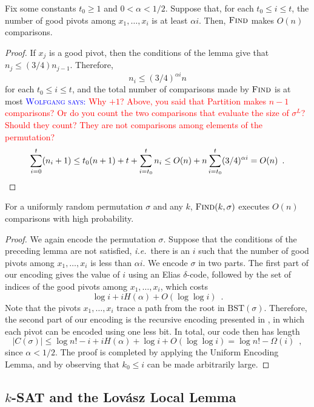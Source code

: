 \documentclass{patmorin}
\newcommand{\aremark}[3]{\textcolor{blue}{\textsc{#1 #2:}}
  \textcolor{red}{\textsf{#3}}}
\newcommand{\wolfgang}[2][says]{\aremark{Wolfgang}{#1}{#2}}
\begin{document}
\begin{lem}
  Fix some constants $t_0 \geq 1$ and $0 < \alpha < 1/2$. Suppose
  that, for each $t_0 \leq i \leq t$, the number of good pivots among
  $x_1, \ldots, x_i$ is at least $\alpha i$. Then, $\textsc{Find}$
  makes $O(n)$ comparisons.
\end{lem}
\begin{proof}
  If $x_j$ is a good pivot, then the conditions of the lemma give
  that $n_j \le (3/4) n_{j - 1}$. Therefore,
  \[
  n_i \leq (3/4)^{\alpha i} n
  \]
  for each $t_0 \leq i \leq t$, and the total number of comparisons
  made by $\textsc{Find}$ is at most \wolfgang{Why $+1$? Above, you
  said that Partition makes $n-1$ comparisons? Or do you count the
  two comparisons that evaluate the size of $\sigma^L$? Should they
  count? They are not comparisons among elements of the permutation?}
  \[
  \sum_{i=0}^t (n_i + 1) \le t_0(n + 1) + t + \sum_{i=t_0}^t n_i \le
  O(n) + n \sum_{i = t_0}^t (3/4)^{\alpha i} = O(n) \enspace . \qedhere
  \]
\end{proof}

\begin{thm}
  For a uniformly random permutation $\sigma$ and any $k$,
  $\textsc{Find}(k, \sigma)$ executes $O(n)$ comparisons with high
  probability.
\end{thm}
\begin{proof}
  We again encode the permutation $\sigma$. Suppose that the
  conditions of the preceding lemma are not satisfied,
  \emph{i.e.}~there is an $i$ such that the number of good pivots
  among $x_1, \dots, x_i$ is less than $\alpha i$. We encode $\sigma$
  in two parts. The first part of our encoding gives the value of $i$
  using an Elias $\delta$-code, followed by the set of indices of the
  good pivots among $x_1, \dots, x_i$, which costs
  \[
  \log i + i H(\alpha) + O(\log \log i) \enspace .
  \]
  Note that the pivots $x_1, \dots, x_i$ trace a path from the root in
  $\text{BST}(\sigma)$. Therefore, the second part of our encoding is
  the recursive encoding presented in , in which each
  pivot can be encoded using one less bit. In total, our code then has
  length
  \[
    |C(\sigma)| \le \log n! - i + i H(\alpha) + \log i + O(\log \log
    i) = \log n! - \Omega(i) \enspace ,
  \]
  since $\alpha < 1/2$. The proof is completed by applying the Uniform
  Encoding Lemma, and by observing that $k_0 \leq i$ can be made
  arbitrarily large.
\end{proof}


\subsection{$k$-SAT and the Lov\'{a}sz Local Lemma}
\end{document}
